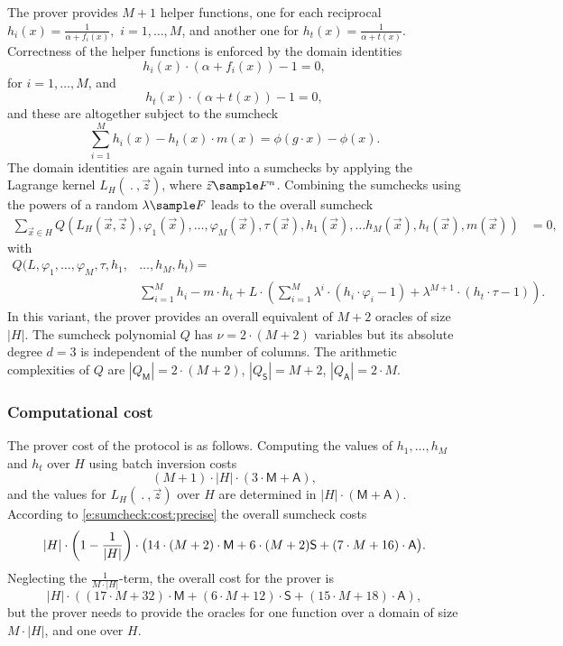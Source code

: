 \documentclass[11pt]{article}
\theoremstyle{definition}
\theoremstyle{definition}
\begin{document}
The prover provides $M+1$ helper functions, one for each reciprocal
$
h_i  (x) = \frac{1}{\alpha + f_i(x)},
$
$i=1,\ldots, M$, and another one for
$
h_{t}(x) = \frac{1}{\alpha + t(x)}.
$
Correctness of the helper functions is enforced by the domain identities
\[
h_i(x) \cdot (\alpha + f_i(x)) - 1 = 0,
\]
for $i=1, \ldots, M$, and
\[
h_{t}(x) \cdot (\alpha + t(x)) - 1 = 0 ,
\]
and these are altogether subject to the sumcheck
\[
\sum_{i=1}^{M} h_i(x) - h_t(x)\cdot m(x) = \phi(g\cdot x ) - \phi(x).
\]
The domain identities are again turned into a sumchecks by applying the Lagrange kernel $L_{H}(\:.\:, \vec z)$, where $\vec z\sample F^n$.
Combining the sumchecks using the powers of a random $\lambda\sample F$ leads to the overall sumcheck  
\begin{align*} 
\sum_{\vec x \in H} Q(L_H(\vec x, \vec z),  \varphi_1(\vec x),\ldots, \varphi_M(\vec x), \tau(\vec x), h_1(\vec x),\ldots h_{M}(\vec x), h_t(\vec x), m(\vec x))&= 0,
\end{align*}
with
\begin{equation}
\label{e:lookup:Q:linear}
\begin{aligned}
Q(L, \varphi_1,\ldots, \varphi_M, \tau, h_1,&\ldots, h_M, h_t) =   
\\
&
\sum_{i=1}^{M} h_i - m\cdot  h_t 
+   L\cdot\left(\sum_{i=1}^{M}\lambda^i \cdot (h_i \cdot \varphi_i - 1)+ \lambda^{M+1} \cdot (h_{t}\cdot\tau - 1) \right).
\end{aligned}
\end{equation}
In this variant, the prover provides an overall equivalent of $M+2$ oracles of size $|H|$. 
The sumcheck polynomial $Q$ has  $\nu= 2\cdot (M + 2)$ variables but its absolute degree $d=3$ is independent of the number of columns.
The arithmetic complexities of $Q$ are $|Q_\mathsf M|=  2\cdot (M+2)$, $|Q_\mathsf S|= M + 2$, $|Q_\mathsf A|=2\cdot M$.

\subsubsection{Computational cost}
The prover cost of the protocol is as follows. 
Computing the values of $h_1, \ldots, h_M$ and $h_t$ over $H$ using batch inversion costs 
\[
(M+1)\cdot |H| \cdot(3 \cdot \mathsf M + \mathsf A),
\]
and the values for $L_{H}(\:.\:, \vec z)$ over $H$ are determined in  $|H|\cdot (\mathsf M + \mathsf A)$.
According to \eqref{e:sumcheck:cost:precise} the overall sumcheck costs
\[
|H| \cdot \left(1-\frac{1}{|H|}\right)\cdot \big(14\cdot (M+2) \cdot \textsf M + 6\cdot (M+2)\textsf S + (7\cdot M +16) \cdot \textsf A\big).
\]
Neglecting the $\frac{1}{M\cdot |H|}$-term, the overall cost for the prover is
\begin{equation}
\label{e:lookup:large:cost}
|H|\cdot ((17\cdot M + 32)\cdot\mathsf M + (6\cdot M + 12)\cdot\mathsf S + (15\cdot M + 18)\cdot\mathsf A),
\end{equation}
but the prover needs to provide the oracles for one function over  a domain of size $M\cdot|H|$, and one over $H$. 
\end{document}
